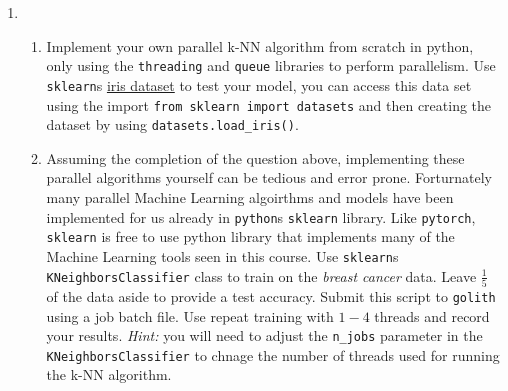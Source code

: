 \begin{enumerate}
\begin{enumerate}
        \item 
        \begin{enumerate}
            \item Implement your own parallel k-NN algorithm from scratch in python, only using the \texttt{threading} and \texttt{queue} libraries to perform parallelism. Use \texttt{sklearn}s \href{https://scikit-learn.org/stable/modules/generated/sklearn.datasets.load_iris.html}{iris dataset} to test your model, you can access this data set using the import \texttt{from sklearn import datasets} and then creating the dataset by using \texttt{datasets.load\_iris()}.
            \item Assuming the completion of the question above, implementing these parallel algorithms yourself can be tedious and error prone. Forturnately many parallel Machine Learning algoirthms and models have been implemented for us already in \texttt{python}s \texttt{sklearn} library. Like \texttt{pytorch}, \texttt{sklearn} is free to use python library that implements many of the Machine Learning tools seen in this course. Use \texttt{sklearn}s \texttt{KNeighborsClassifier} class to train on the \textit{breast cancer} data. Leave $\frac{1}{5}$ of the data aside to provide a test accuracy. Submit this script to \texttt{golith} using a job batch file. Use repeat training with $1-4$ threads and record your results. {\it Hint:} you will need to adjust the \texttt{n\_jobs} parameter in the \texttt{KNeighborsClassifier} to chnage the number of threads used for running the k-NN algorithm.
        \end{enumerate}
    \end{enumerate}

\end{enumerate}